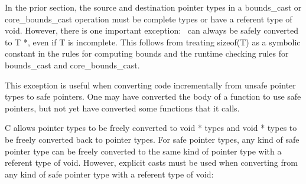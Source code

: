 In the prior section, the source and destination pointer types in a
bounds\_cast or core\_bounds\_cast operation must be complete types or
have a referent type of void. However, there is one important exception:
\ptrT\ can always be safely converted to T *,
even if T is incomplete. This follows from treating sizeof(T) as a
symbolic constant in the rules for computing bounds and the runtime
checking rules for bounds\_cast and core\_bounds\_cast.

This exception is useful when converting code incrementally from unsafe
pointer types to safe pointers. One may have converted the body of a
function to use safe pointers, but not yet have converted some functions
that it calls.

C allows pointer types to be freely converted to void * types and void *
types to be freely converted back to pointer types. For safe pointer
types, any kind of safe pointer type can be freely converted to the same
kind of pointer type with a referent type of void. However, explicit
casts must be used when converting from any kind of safe pointer type
with a referent type of void:


